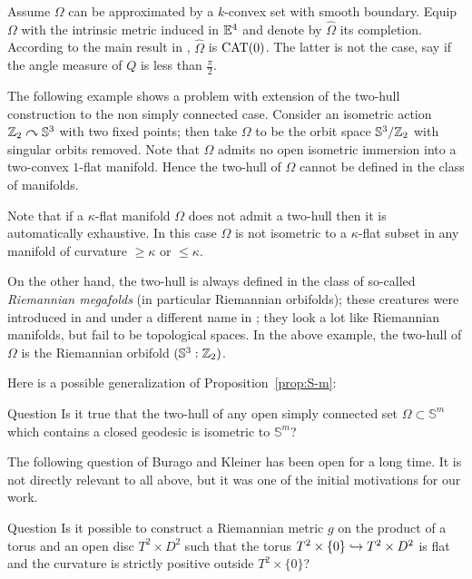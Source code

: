\documentclass[oneside,a4paper]{article}
\begin{document}
Assume $\Omega$ can be approximated
 by a $k$-convex set with smooth boundary.
Equip $\Omega$ with the intrinsic metric induced in $\mathbb{E}^4$
and denote by $\hat\Omega$ its completion. 
According to the main result in \cite{ABB}, 
$\hat\Omega$ is $\mathrm{CAT}(0)$. 
The latter is not the case, say if the angle measure of $Q$ is less than $\tfrac\pi2$.

The following example shows a problem with extension of the
two-hull construction to the  non simply connected case.
Consider an isometric action $\mathbb{Z}_2\curvearrowright\mathbb S^3$ with two fixed points;
then take $\Omega$ to be the orbit space $\mathbb S^3/\mathbb{Z}_2$ with singular orbits removed.
Note that $\Omega$ admits no open isometric immersion into a two-convex $1$-flat manifold.
Hence the two-hull of $\Omega$ cannot be defined in the class of manifolds.

Note that if a $\kappa$-flat manifold $\Omega$ does not admit a two-hull then
it is automatically exhaustive. In this case %
$\Omega$ is not isometric to a $\kappa$-flat subset in any manifold of curvature $\ge \kappa$ or $\le \kappa$.

On the other hand, the two-hull is always defined in the class of so-called \emph{Riemannian megafolds} (in particular Riemannian orbifolds);
these creatures were introduced in \cite{petrunin-tuschmann} and under a different name in  \cite{lott};
they look a lot like Riemannian manifolds,
but fail to be topological spaces.
In the above example, the two-hull of $\Omega$ is the Riemannian orbifold $(\mathbb S^3:\mathbb{Z}_2)$. 

Here is a possible generalization of Proposition~\ref{prop:S-m}:

\begin{thm}{Question}
 Is it true that the two-hull of any open simply connected set $\Omega\subset\mathbb S^m$ which contains a closed geodesic is isometric to $\mathbb S^m$?
\end{thm}



The following question of Burago and Kleiner has been open for a long time.
It is not directly relevant to all above,
but it was one of the initial motivations for our work.

\begin{thm}{Question}
Is it possible to construct a Riemannian metric $g$ on the product of a
torus and an open disc $T^2\times D^2$
such that the torus $T^2\times \{0\}\z\hookrightarrow T^2\times D^2$ is flat
and the curvature is strictly positive outside $T^2\times \{0\}$?
\end{thm}
\end{document}

